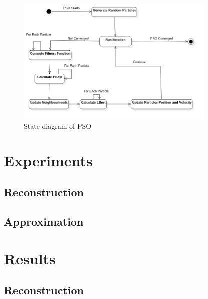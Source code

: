 \documentclass[runningheads, a4paper]{llncs}
\begin{document}
\begin{figure}[h]
\label{fig:state_pso}
\caption{State diagram of PSO}
    \includegraphics[width=0.85\textwidth]{res/uml/states/pso.jpg}
\end{figure}



\section{Experiments}

\subsection{Reconstruction}
\subsection{Approximation}

\section{Results}


\subsection{Reconstruction}







\end{document}

